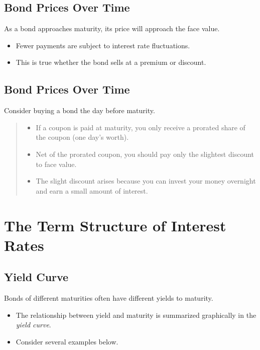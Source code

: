 \documentclass[letterpaper,10pt,english]{sphinxmanual}
\begin{document}
\subsection{Bond Prices Over Time}
\label{bondPrices:bond-prices-over-time}
As a bond approaches maturity, its price will approach the face
value.
\begin{itemize}
\item {} 
Fewer payments are subject to interest rate fluctuations.

\end{itemize}
\begin{itemize}
\item {} 
This is true whether the bond sells at a premium or discount.

\end{itemize}


\subsection{Bond Prices Over Time}
\label{bondPrices:id17}
Consider buying a bond the day before maturity.
\begin{quote}
\begin{itemize}
\item {} 
If a coupon is paid at maturity, you only receive a prorated share
of the coupon (one day's worth).

\end{itemize}
\begin{itemize}
\item {} 
Net of the prorated coupon, you should pay only the slightest
discount to face value.

\end{itemize}
\begin{itemize}
\item {} 
The slight discount arises because you can invest your money
overnight and earn a small amount of interest.

\end{itemize}
\end{quote}


\section{The Term Structure of Interest Rates}
\label{termStructure:the-term-structure-of-interest-rates}\label{termStructure::doc}

\subsection{Yield Curve}
\label{termStructure:yield-curve}
Bonds of different maturities often have different yields to maturity.
\begin{itemize}
\item {} 
The relationship between yield and maturity is summarized
graphically in the \emph{yield curve}.

\end{itemize}
\begin{itemize}
\item {} 
Consider several examples below.

\end{itemize}
\end{document}
